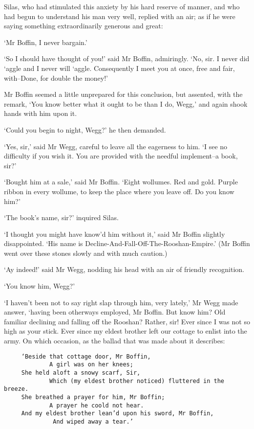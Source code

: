 Silas, who had stimulated this anxiety by his hard reserve of manner,
and who had begun to understand his man very well, replied with an air;
as if he were saying something extraordinarily generous and great:

‘Mr Boffin, I never bargain.’

‘So I should have thought of you!’ said Mr Boffin, admiringly. ‘No, sir.
I never did ‘aggle and I never will ‘aggle. Consequently I meet you at
once, free and fair, with--Done, for double the money!’

Mr Boffin seemed a little unprepared for this conclusion, but assented,
with the remark, ‘You know better what it ought to be than I do, Wegg,’
and again shook hands with him upon it.

‘Could you begin to night, Wegg?’ he then demanded.

‘Yes, sir,’ said Mr Wegg, careful to leave all the eagerness to him.
‘I see no difficulty if you wish it. You are provided with the needful
implement--a book, sir?’

‘Bought him at a sale,’ said Mr Boffin. ‘Eight wollumes. Red and gold.
Purple ribbon in every wollume, to keep the place where you leave off.
Do you know him?’

‘The book’s name, sir?’ inquired Silas.

‘I thought you might have know’d him without it,’ said Mr
Boffin slightly disappointed. ‘His name is
Decline-And-Fall-Off-The-Rooshan-Empire.’ (Mr Boffin went over these
stones slowly and with much caution.)

‘Ay indeed!’ said Mr Wegg, nodding his head with an air of friendly
recognition.

‘You know him, Wegg?’

‘I haven’t been not to say right slap through him, very lately,’ Mr Wegg
made answer, ‘having been otherways employed, Mr Boffin. But know him?
Old familiar declining and falling off the Rooshan? Rather, sir! Ever
since I was not so high as your stick. Ever since my eldest brother left
our cottage to enlist into the army. On which occasion, as the ballad
that was made about it describes:

\begin{verbatim}
     ‘Beside that cottage door, Mr Boffin,
             A girl was on her knees;
     She held aloft a snowy scarf, Sir,
             Which (my eldest brother noticed) fluttered in the breeze.
     She breathed a prayer for him, Mr Boffin;
             A prayer he coold not hear.
     And my eldest brother lean’d upon his sword, Mr Boffin,
              And wiped away a tear.’
\end{verbatim}

